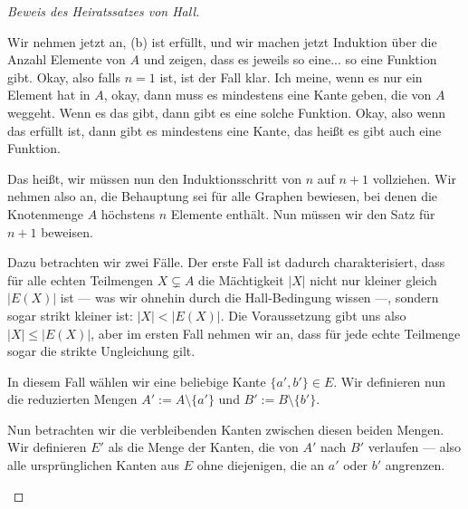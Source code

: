 \begin{proof}[Beweis des Heiratssatzes von Hall]
\begin{spoken-clean}[01:16:15 - 01:17:20]
Wir nehmen jetzt an, (b) ist erfüllt, und wir machen jetzt Induktion über die Anzahl Elemente von $A$ und zeigen, dass es jeweils so eine... so eine Funktion gibt. Okay, also falls $n = 1$ ist, ist der Fall klar. Ich meine, wenn es nur ein Element hat in $A$, okay, dann muss es mindestens eine Kante geben, die von $A$ weggeht. Wenn es das gibt, dann gibt es eine solche Funktion. Okay, also wenn das erfüllt ist, dann gibt es mindestens eine Kante, das heißt es gibt auch eine Funktion.
\end{spoken-clean}

\begin{spoken-clean}[01:17:20 - 01:18:30]
Das heißt, wir müssen nun den Induktionsschritt von $n$ auf $n+1$ vollziehen. Wir nehmen also an, die Behauptung sei für alle Graphen bewiesen, bei denen die Knotenmenge $A$ höchstens $n$ Elemente enthält. Nun müssen wir den Satz für $n+1$ beweisen.
\end{spoken-clean}

\begin{spoken-clean}[01:18:30 - 01:20:00]
Dazu betrachten wir zwei Fälle. Der erste Fall ist dadurch charakterisiert, dass für alle echten Teilmengen $X \subsetneq A$ die Mächtigkeit $|X|$ nicht nur kleiner gleich $|E(X)|$ ist --- was wir ohnehin durch die Hall-Bedingung wissen ---, sondern sogar strikt kleiner ist: $|X| < |E(X)|$. Die Voraussetzung gibt uns also $|X| \le |E(X)|$, aber im ersten Fall nehmen wir an, dass für jede echte Teilmenge sogar die strikte Ungleichung gilt.
\end{spoken-clean}

\begin{spoken-clean}[01:20:00 - 01:21:30]
In diesem Fall wählen wir eine beliebige Kante $\{a', b'\} \in E$. Wir definieren nun die reduzierten Mengen $A' := A \setminus \{a'\}$ und $B' := B \setminus \{b'\}$.
\end{spoken-clean}

\begin{ai-global-state-checkpoint-invisible-content}
\end{ai-global-state-checkpoint-invisible-content}

\begin{spoken-clean}[01:21:30 - 01:22:50]
Nun betrachten wir die verbleibenden Kanten zwischen diesen beiden Mengen. Wir definieren $E'$ als die Menge der Kanten, die von $A'$ nach $B'$ verlaufen --- also alle ursprünglichen Kanten aus $E$ ohne diejenigen, die an $a'$ oder $b'$ angrenzen.
\end{spoken-clean}


\end{proof}
